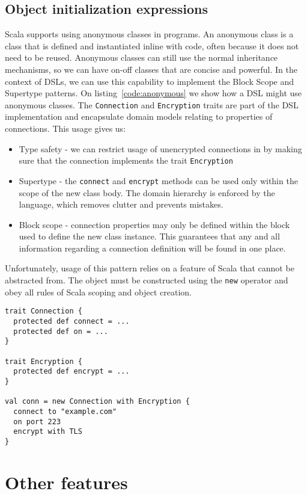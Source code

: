 \subsection{Object initialization expressions}

Scala supports using anonymous classes in programs. An anonymous class is a class that is defined and instantiated inline with code, often because it does not need to be reused. Anonymous classes can still use the normal inheritance mechanisms, so we can have on-off classes that are concise and powerful. In the context of DSLs, we can use this capability to implement the Block Scope and Supertype patterns. On listing~\ref{code:anonymous} we show how a DSL might use anonymous classes. The \texttt{Connection} and \texttt{Encryption} traits are part of the DSL implementation and encapsulate domain models relating to properties of connections. This usage gives us:
\begin{itemize}
	\item Type safety - we can restrict usage of unencrypted connections in by making sure that the connection implements the trait \texttt{Encryption}
	\item Supertype - the \texttt{connect} and \texttt{encrypt} methods can be used only within the scope of the new class body. The domain hierarchy is enforced by the language, which removes clutter and prevents mistakes.
	\item Block scope - connection properties may only be defined within the block used to define the new class instance. This guarantees that any and all information regarding a connection definition will be found in one place.
\end{itemize}

Unfortunately, usage of this pattern relies on a feature of Scala that cannot be abstracted from. The object must be constructed using the \texttt{new} operator and obey all rules of Scala scoping and object creation.

\begin{lstlisting}[caption=Anonymous classes, label=code:anonymous]
trait Connection {
  protected def connect = ...
  protected def on = ...
}

trait Encryption {
  protected def encrypt = ...
}

val conn = new Connection with Encryption {
  connect to "example.com"
  on port 223
  encrypt with TLS
}
\end{lstlisting}

\section{Other features}

